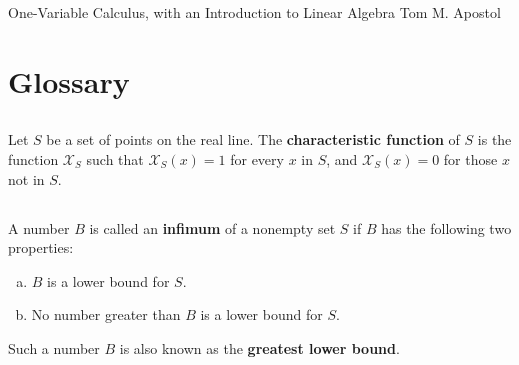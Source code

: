 \documentclass{report}
\begin{document}
\header
  {One-Variable Calculus, with an Introduction to Linear Algebra}
  {Tom M. Apostol}

\tableofcontents

\chapter{Glossary}%
\label{chap:glossary}

\section{}%
\label{sec:def-characteristic-function}

Let $S$ be a set of points on the real line.
The \textbf{characteristic function} of $S$ is the function $\mathcal{X}_S$ such
  that $\mathcal{X}_S(x) = 1$ for every $x$ in $S$, and $\mathcal{X}_S(x) = 0$
  for those $x$ not in $S$.

\begin{definition}


\end{definition}

\section{}%
\label{sec:def-infimum}

A number $B$ is called an \textbf{infimum} of a nonempty set $S$ if $B$ has
  the following two properties:
  \begin{enumerate}[(a)]
    \item $B$ is a lower bound for $S$.
    \item No number greater than $B$ is a lower bound for $S$.
  \end{enumerate}
Such a number $B$ is also known as the \textbf{greatest lower bound}.

\begin{definition}


\end{definition}

\section{}%
\label{sec:def-integrable}
\end{document}
